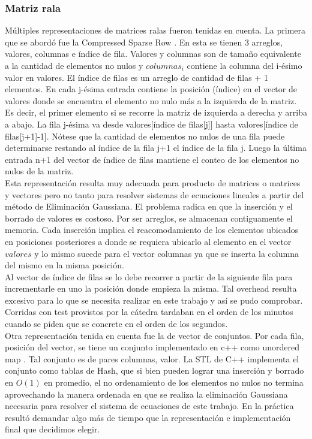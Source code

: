 \subsubsection{Matriz rala}

Múltiples representaciones de matrices ralas fueron tenidas en cuenta. La primera que se abordó fue la Compressed Sparse Row \cite{CSR}. En esta se tienen 3 arreglos, valores, columnas e índice de fila. Valores y columnas son de tamaño equivalente a la cantidad de elementos no nulos y  $columnas_{i}$ contiene la columna del i-ésimo valor en valores. El índice de filas es un arreglo de cantidad de filas + 1 elementos. 
En cada j-ésima entrada contiene la posición (índice) en el vector de valores donde se encuentra el elemento no nulo más a la izquierda de la matriz. Es decir, el primer elemento si se recorre la matriz de izquierda a derecha y arriba a abajo. La fila j-ésima va desde valores[índice de filas[j]] hasta valores[índice de filas[j+1]-1]. Nótese que la cantidad de elementos no nulos de una fila puede determinarse restando al índice de la fila j+1 el índice de la fila j. Luego la última entrada n+1 del vector de índice de filas mantiene el conteo de los elementos no nulos de la matriz.  \\

Esta representación resulta muy adecuada para producto de matrices o matrices y vectores pero no tanto para resolver sistemas de ecuaciones lineales a partir del método de Eliminación Gaussiana. El problema radica en que la inserción y el borrado de valores es costoso. Por ser arreglos, se almacenan contiguamente el memoria. Cada inserción implica el reacomodamiento de los elementos ubicados en posiciones posteriores a donde se requiera ubicarlo al elemento en el vector $valores$ y lo mismo sucede para el vector columnas ya que se inserta la columna del mismo en la misma posición.\\

Al vector de índice de filas se lo debe recorrer a partir de la siguiente fila para incrementarle en uno la posición donde empieza la misma. Tal overhead resulta excesivo para lo que se necesita realizar en este trabajo y así se pudo comprobar. Corridas con test provistos por la cátedra tardaban en el orden de los minutos cuando se piden que se concrete en el orden de los segundos.\\

Otra representación tenida en cuenta fue la de vector de conjuntos. Por cada fila, posición del vector, se tiene un conjunto implementado en c++ como unordered map \cite{STL}. Tal conjunto es de pares columnas, valor. La STL de C++ implementa el conjunto como tablas de Hash, que si bien pueden lograr una inserción y borrado en $O(1)$ en promedio, el no ordenamiento de los elementos no nulos no termina aprovechando la manera ordenada en que se realiza la eliminación Gaussiana necesaria para resolver el sistema de ecuaciones de este trabajo. En la práctica resultó demandar algo más de tiempo que la representación e implementación final que decidimos elegir. \\

